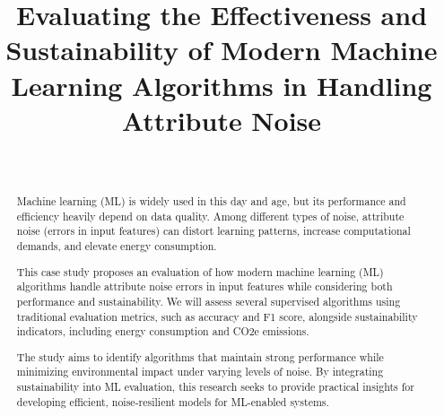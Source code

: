 \documentclass[conference]{IEEEtran}
\begin{document}
\title{Evaluating the Effectiveness and Sustainability of Modern Machine Learning Algorithms in Handling Attribute Noise}

\author{
 \\
}

\maketitle

\begin{abstract}
Machine learning (ML) is widely used in this day and age, but its performance and efficiency heavily depend on data quality. Among different types of noise, attribute noise (errors in input features) can distort learning patterns, increase computational demands, and elevate energy consumption.

This case study proposes an evaluation of how modern machine learning (ML) algorithms handle attribute noise errors in input features while considering both performance and sustainability. We will assess several supervised algorithms using traditional evaluation metrics, such as accuracy and F1 score, alongside sustainability indicators, including energy consumption and CO2e emissions.
    
The study aims to identify algorithms that maintain strong performance while minimizing environmental impact under varying levels of noise. By integrating sustainability into ML evaluation, this research seeks to provide practical insights for developing efficient, noise-resilient models for ML-enabled systems.
\end{abstract}


\end{document}
